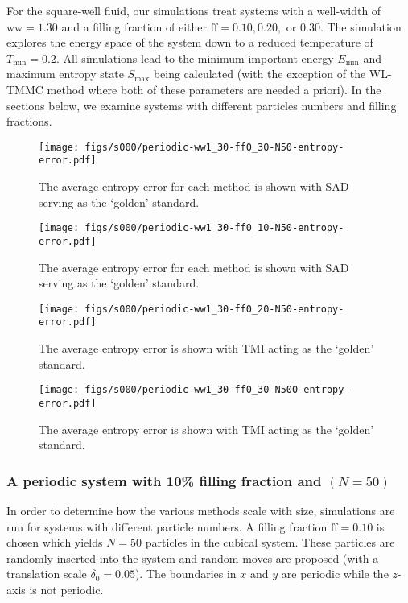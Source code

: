 \documentclass[letterpaper,twocolumn,amsmath,amssymb,pre,aps,10pt]{revtex4-1}
\begin{document}
For the square-well fluid, our simulations treat systems with a
well-width of $\text{ww} = 1.30$ and a filling fraction of either
$\text{ff} = 0.10, 0.20,$ or $0.30$.  The simulation explores the
energy space of the system down to a reduced temperature of
$T_{\text{min}} = 0.2$.  All simulations lead to the minimum important
energy $E_{\text{min}}$ and maximum entropy state $S_{\text{max}}$
being calculated (with the exception of the WL-TMMC method where both
of these parameters are needed a priori).  In the sections below, we
examine systems with different particles numbers and filling fractions.

\begin{figure}
  \texttt{[image: figs/s000/periodic-ww1\_30-ff0\_30-N50-entropy-error.pdf]}
  \caption{The average entropy error for each method is shown with
  SAD serving as the `golden'
  standard.}\label{fig:N50-ff0.3-max-error}
\end{figure}
\begin{figure}
  \texttt{[image: figs/s000/periodic-ww1\_30-ff0\_10-N50-entropy-error.pdf]}
  \caption{The average entropy error for each method is shown with SAD serving as
  the `golden' standard.}\label{fig:N50-ff0.1-max-error}
\end{figure}
\begin{figure}
  \texttt{[image: figs/s000/periodic-ww1\_30-ff0\_20-N50-entropy-error.pdf]}
  \caption{The average entropy error is shown with TMI acting as the
  `golden' standard.}\label{fig:N50-ff0.2-max-error}
\end{figure}
\begin{figure}
\texttt{[image: figs/s000/periodic-ww1\_30-ff0\_30-N500-entropy-error.pdf]}
  \caption{The average entropy error is shown with TMI acting as the
  `golden' standard.}
\end{figure}

\subsubsection{A periodic system with 10\% filling fraction and $(N = 50)$}
In order to determine how the various methods scale with size,
simulations are run for systems with different particle numbers. A filling
fraction $\text{ff} = 0.10$ is chosen which yields $N = 50$ particles
in the cubical system.  These particles are randomly inserted into the
system and random moves are proposed (with a translation scale
$\delta_0 = 0.05$). The boundaries in $x$ and $y$ are periodic while
the $z$-axis is not periodic.
\end{document}
